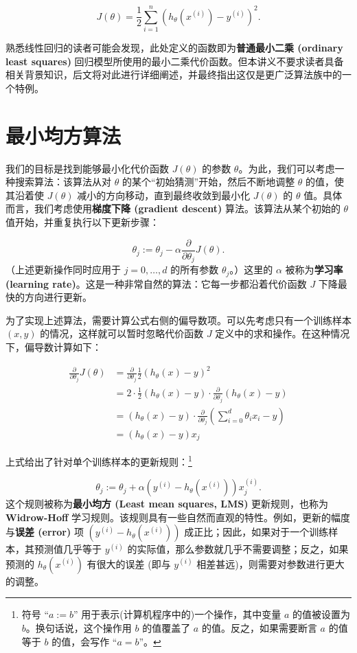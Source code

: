 \[
    J(\theta) = \frac{1}{2} \sum_{i=1}^n (h_\theta(x^{(i)}) - y^{(i)})^2.
\]

熟悉线性回归的读者可能会发现，此处定义的函数即为\textbf{普通最小二乘 (ordinary least squares)} 回归模型所使用的最小二乘代价函数。但本讲义不要求读者具备相关背景知识，后文将对此进行详细阐述，并最终指出这仅是更广泛算法族中的一个特例。


\section{最小均方算法}

我们的目标是找到能够最小化代价函数 $J(\theta)$ 的参数 $\theta$。为此，我们可以考虑一种搜索算法：该算法从对 $\theta$ 的某个“初始猜测”开始，然后不断地调整 $\theta$ 的值，使其沿着使 $J(\theta)$ 减小的方向移动，直到最终收敛到最小化 $J(\theta)$ 的 $\theta$ 值。具体而言，我们考虑使用\textbf{梯度下降 (gradient descent)} 算法。该算法从某个初始的 $\theta$ 值开始，并重复执行以下更新步骤：

\[
    \theta_j := \theta_j - \alpha \frac{\partial}{\partial\theta_j} J(\theta).
\]
（上述更新操作同时应用于 $j = 0, \dots, d$ 的所有参数 $\theta_j$。）这里的 $\alpha$ 被称为\textbf{学习率 (learning rate)}。这是一种非常自然的算法：它每一步都沿着代价函数 $J$ 下降最快的方向进行更新。

为了实现上述算法，需要计算公式右侧的偏导数项。可以先考虑只有一个训练样本 $(x, y)$ 的情况，这样就可以暂时忽略代价函数 $J$ 定义中的求和操作。在这种情况下，偏导数计算如下：

\[
    \begin{aligned}
    \frac{\partial}{\partial\theta_j} J(\theta) &= \frac{\partial}{\partial\theta_j} \frac{1}{2} (h_\theta(x) - y)^2 \\
    &= 2 \cdot \frac{1}{2} (h_\theta(x) - y) \cdot \frac{\partial}{\partial\theta_j} (h_\theta(x) - y) \\
    &= (h_\theta(x) - y) \cdot \frac{\partial}{\partial\theta_j} \left( \sum_{i=0}^d \theta_i x_i - y \right) \\
    &= (h_\theta(x) - y) x_j
    \end{aligned}
\]

上式给出了针对单个训练样本的更新规则：\footnote{符号 “$a := b$” 用于表示(计算机程序中的)一个操作，其中变量 $a$ 的值被设置为 $b$。换句话说，这个操作用 $b$ 的值覆盖了 $a$ 的值。反之，如果需要断言 $a$ 的值等于 $b$ 的值，会写作 “$a = b$”。}

\[
    \theta_j := \theta_j + \alpha (y^{(i)} - h_\theta(x^{(i)})) x_j^{(i)}.
\]
这个规则被称为\textbf{最小均方 (Least mean squares, LMS)} 更新规则，也称为 \textbf{Widrow-Hoff} 学习规则。该规则具有一些自然而直观的特性。例如，更新的幅度与\textbf{误差 (error)} 项 $(y^{(i)} - h_\theta(x^{(i)}))$ 成正比；因此，如果对于一个训练样本，其预测值几乎等于 $y^{(i)}$ 的实际值，那么参数就几乎不需要调整；反之，如果预测的 $h_\theta(x^{(i)})$ 有很大的误差 (即与 $y^{(i)}$ 相差甚远)，则需要对参数进行更大的调整。

